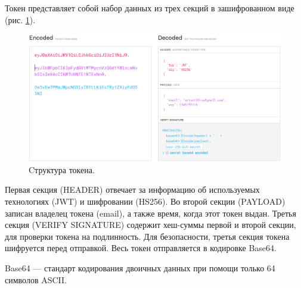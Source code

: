 Токен представляет собой набор данных из трех секций в зашифрованном виде (рис. \ref{fig:token1}).
\begin{figure}[h]
    \centering
    \includegraphics[width=1\linewidth]{img/token1.png}
    \caption{Cтруктура токена.}
    \label{fig:token1}
\end{figure}
Первая секция (HEADER) отвечает за информацию об используемых технологиях (JWT) и шифровании (HS256).
Во второй секции (PAYLOAD) записан владелец токена (email), а также время, когда этот токен выдан.
Третья секция (VERIFY SIGNATURE) содержит хеш-суммы первой и второй секции, для проверки токена на подлинность.
Для безопасности, третья секция токена шифруется перед отправкой. Весь токен отправляется в кодировке Base64.
\begin{definition}
   Base64 --- стандарт кодирования двоичных данных при помощи только 64 символов ASCII.
\end{definition}


\clearpage
